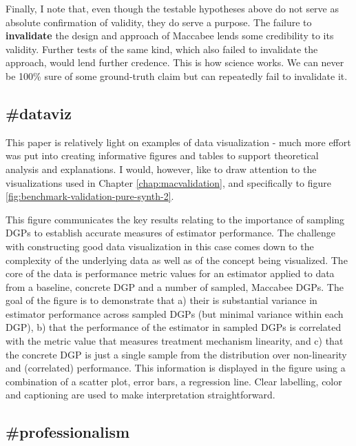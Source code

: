 \documentclass[./main.tex]{subfiles}
\begin{document}
Finally, I note that, even though the testable hypotheses above do not serve as absolute confirmation of validity, they do serve a purpose. The failure to \textbf{invalidate} the design and approach of Maccabee lends some credibility to its validity. Further tests of the same kind, which also failed to invalidate the approach, would lend further credence. This is how science works. We can never be 100\% sure of some ground-truth claim but can repeatedly fail to invalidate it.


\subsection{\textbf{\#dataviz}}
\label{hc:dataviz}

This paper is relatively light on examples of data visualization - much more effort was put into creating informative figures and tables to support theoretical analysis and explanations. I would, however, like to draw attention to the visualizations used in Chapter \ref{chap:macvalidation}, and specifically to figure \ref{fig:benchmark-validation-pure-synth-2}. 

\vspace{\baselineskip}

This figure communicates the key results relating to the importance of sampling DGPs to establish accurate measures of estimator performance. The challenge with constructing good data visualization in this case comes down to the complexity of the underlying data as well as of the concept being visualized. The core of the data is performance metric values for an estimator applied to data from a baseline, concrete DGP and a number of sampled, Maccabee DGPs. The goal of the figure is to demonstrate that a) their is substantial variance in estimator performance across sampled DGPs (but minimal variance within each DGP), b) that the performance of the estimator in sampled DGPs is correlated with the metric value that measures treatment mechanism linearity, and c) that the concrete DGP is just a single sample from the distribution over non-linearity and (correlated) performance. This information is displayed in the figure using a combination of a scatter plot, error bars, a regression line. Clear labelling, color and captioning are used to make interpretation straightforward.


\subsection{\textbf{\#professionalism}}
\label{hc:professionalism}
\end{document}
